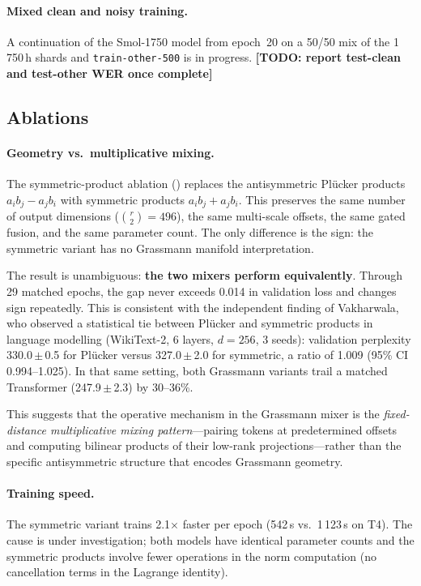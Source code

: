 \documentclass[11pt,a4paper]{article}
\newcommand{\plucker}{Pl\"{u}cker}
\newcommand{\TODO}[1]{{\color{red}\textbf{[TODO: #1]}}}
\begin{document}
\paragraph{Mixed clean and noisy training.}
A continuation of the Smol-1750 model from epoch~20 on a 50/50 mix of
the 1\,750\,h shards and \texttt{train-other-500} is in progress.
\TODO{report test-clean and test-other WER once complete}

\subsection{Ablations}
\label{sec:ablations}

\paragraph{Geometry vs.\ multiplicative mixing.}
The symmetric-product ablation () replaces the
antisymmetric \plucker{} products $a_i b_j - a_j b_i$ with symmetric
products $a_i b_j + a_j b_i$.  This preserves the same number of
output dimensions ($\binom{r}{2} = 496$), the same multi-scale offsets,
the same gated fusion, and the same parameter count.  The only
difference is the sign: the symmetric variant has no Grassmann manifold
interpretation.

The result is unambiguous: \textbf{the two mixers perform
equivalently}.  Through 29 matched epochs, the gap never exceeds 0.014
in validation loss and changes sign repeatedly.  This is consistent
with the independent finding of Vakharwala, who observed a statistical
tie between \plucker{} and symmetric products in language modelling
(WikiText-2, 6 layers, $d=256$, 3 seeds): validation perplexity
330.0\,$\pm$\,0.5 for \plucker{} versus 327.0\,$\pm$\,2.0 for
symmetric, a ratio of 1.009 (95\% CI 0.994--1.025).  In that same
setting, both Grassmann variants trail a matched Transformer
(247.9\,$\pm$\,2.3) by 30--36\%.

This suggests that the operative mechanism in the Grassmann mixer is
the \emph{fixed-distance multiplicative mixing pattern}---pairing
tokens at predetermined offsets and computing bilinear products of
their low-rank projections---rather than the specific antisymmetric
structure that encodes Grassmann geometry.

\paragraph{Training speed.}
The symmetric variant trains 2.1$\times$ faster per epoch (542\,s
vs.\ 1\,123\,s on T4).  The cause is under investigation; both
models have identical parameter counts and the symmetric products
involve fewer operations in the norm computation (no cancellation terms
in the Lagrange identity).
\end{document}
